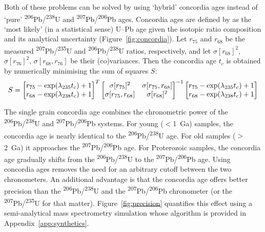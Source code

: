 \documentclass[gchron, manuscript]{copernicus}
\begin{document}
Both of these problems can be solved by using `hybrid' concordia ages
instead of `pure' \textsuperscript{206}Pb/\textsuperscript{238}U and
\textsuperscript{207}Pb/\textsuperscript{206}Pb ages. Concordia ages
are defined by \citet{ludwig1998} as the `most likely' (in a
statistical sense) U--Pb age given the isotopic ratio composition and
its analytical uncertainty (Figure~\ref{fig:concordia}).  Let $r_{75}$
and $r_{68}$ be the measured
\textsuperscript{207}Pb/\textsuperscript{235}U and
\textsuperscript{206}Pb/\textsuperscript{238}U ratios, respectively,
and let $\sigma[r_{68}]^2$, $\sigma[r_{76}]^2$,
$\sigma[r_{68},r_{76}]$ be their (co)variances.  Then the concordia
age $t_c$ is obtained by numerically minimising the sum of squares
$S$:
\begin{equation}
  S = \left[
    \begin{array}{@{}c@{}}
      r_{75} - \exp(\lambda_{235}t_c) + 1 \\
      r_{68} - \exp(\lambda_{238}t_c) + 1
    \end{array}
    \right]^T\left[
    \begin{array}{@{}cc@{}}
      \sigma[r_{75}]^2 & \sigma[r_{75},r_{68}] \\
      \sigma[r_{75},r_{68}] & \sigma[r_{68}]^2
    \end{array}
    \right]^{-1}
  \left[
    \begin{array}{@{}c@{}}
      r_{75} - \exp(\lambda_{235}t_c) + 1 \\
      r_{68} - \exp(\lambda_{238}t_c) + 1      
    \end{array}
    \right]
  \label{eq:S}
\end{equation}

The single grain concordia age combines the chronometric power of the
\textsuperscript{206}Pb/\textsuperscript{238}U and
\textsuperscript{207}Pb/\textsuperscript{206}Pb systems. For young
($<$1~Ga) samples, the concordia age is nearly identical to the
\textsuperscript{206}Pb/\textsuperscript{238}U age. For old samples
($>$2~Ga) it approaches the
\textsuperscript{207}Pb/\textsuperscript{206}Pb age. For Proterozoic
samples, the concordia age gradually shifts from the
\textsuperscript{206}Pb/\textsuperscript{238}U to the
\textsuperscript{207}Pb/\textsuperscript{206}Pb age. Using concordia
ages removes the need for an arbitrary cutoff between the two
chronometers. An additional advantage is that the concordia age offers
better precision than the
\textsuperscript{206}Pb/\textsuperscript{238}U and the
\textsuperscript{207}Pb/\textsuperscript{206}Pb chronometer (or the
\textsuperscript{207}Pb/\textsuperscript{235}U for that matter).
Figure~\ref{fig:precision} quantifies this effect using a
semi-analytical mass spectrometry simulation whose algorithm is
provided in Appendix~\ref{app:synthetics}.
\end{document}

